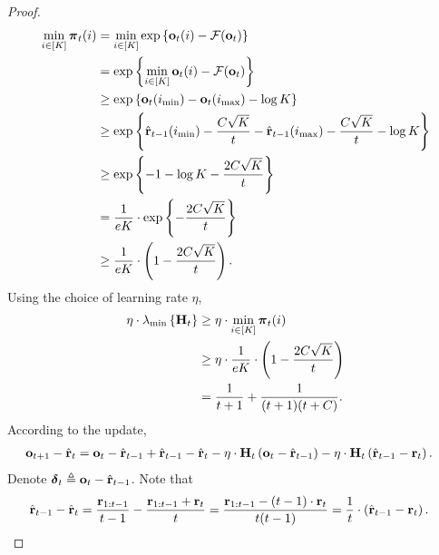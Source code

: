 \documentclass[10pt]{article}
\begin{document}
\begin{proof}
\begin{equation*}
\begin{split}
    \min\limits_{i \in [K]}{{\boldsymbol{\pi}}_t(i)} &= \min\limits_{i \in [K]}{ \exp\left\{ {\mathbf{o}}_t(i) - {\mathcal{F}}({\mathbf{o}}_t) \right\} } \\
    &= \exp\left\{ \min\limits_{i \in [K]}{{\mathbf{o}}_t(i)} - {\mathcal{F}}({\mathbf{o}}_t) \right\} \\
    &\ge \exp\left\{ {\mathbf{o}}_t(i_{\min}) - {\mathbf{o}}_t(i_{\max}) - \log{K} \right\} \\
    &\ge \exp\left\{ \hat{{\mathbf{r}}}_{t-1}(i_{\min}) - \frac{C \sqrt{K}}{t} - \hat{{\mathbf{r}}}_{t-1}(i_{\max}) - \frac{C \sqrt{K}}{t} - \log{K} \right\} \\
    &\ge \exp\left\{ -1 - \log{K} - \frac{2 C \sqrt{K}}{t} \right\} \\
    &= \frac{1}{e K} \cdot \exp\left\{ - \frac{2 C \sqrt{K}}{t} \right\} \\
    &\ge \frac{1}{e K} \cdot \left( 1 - \frac{2 C \sqrt{K}}{t} \right).
\end{split}
\end{equation*}
Using the choice of learning rate $\eta$,
\begin{equation*}
\begin{split}
    \eta \cdot \lambda_{\min}\left\{ {\mathbf{H}}_t \right\} &\ge \eta \cdot \min\limits_{i \in [K]}{{\boldsymbol{\pi}}_t(i)} \\
    &\ge \eta \cdot \frac{1}{e K} \cdot \left( 1 - \frac{2 C \sqrt{K}}{t} \right) \\
    &= \frac{1}{t+1} + \frac{1}{(t+1)(t+C)}.
\end{split}
\end{equation*}
According to the update,
\begin{equation*}
\begin{split}
    {\mathbf{o}}_{t+1} - \hat{{\mathbf{r}}}_t &= {\mathbf{o}}_{t} - \hat{{\mathbf{r}}}_{t-1} + \hat{{\mathbf{r}}}_{t-1} - \hat{{\mathbf{r}}}_t - \eta \cdot {\mathbf{H}}_t \left( {\mathbf{o}}_{t} - \hat{{\mathbf{r}}}_{t-1} \right) - \eta \cdot {\mathbf{H}}_t \left( \hat{{\mathbf{r}}}_{t-1} - {\mathbf{r}}_t \right).
\end{split}
\end{equation*}
Denote ${\boldsymbol{\delta}}_{t} \triangleq {\mathbf{o}}_{t} - \hat{{\mathbf{r}}}_{t-1}$. Note that
\begin{equation*}
\begin{split}
    \hat{{\mathbf{r}}}_{t-1} - \hat{{\mathbf{r}}}_t &= \frac{{\mathbf{r}}_{1:t-1}}{t-1} - \frac{{\mathbf{r}}_{1:t-1} + {\mathbf{r}}_t}{t} = \frac{{\mathbf{r}}_{1:t-1} - (t-1) \cdot {\mathbf{r}}_t }{t(t-1)} = \frac{1}{t} \cdot \left( \hat{{\mathbf{r}}}_{t-1} - {\mathbf{r}}_t \right).
\end{split}
\end{equation*}

\end{proof}
\end{document}
